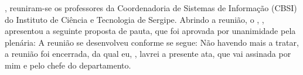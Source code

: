 \documentclass[12pt,a4paper]{ata}
\begin{document}
%
\label{Introdução da ata}
\hojeporextenso, reuniram-se \tiporeuniaoadv{} os professores da Coordenadoria de Sistemas de Informação (CBSI) do Instituto de Ciência e Tecnologia de Sergipe.
%
\presentes
%
%
\justificados
%
\ausentes
%
Abrindo a reunião, o \prof \presidiu, \cargopresidiu, apresentou a
seguinte proposta de pauta, que foi aprovada por unanimidade pela
plenária:
%
\pauta
%
A reunião se desenvolveu conforme se segue:
% 
\desenvolvimento
% 
Não havendo mais a tratar, a reunião foi encerrada, da qual eu,
\secretariou, lavrei a presente ata, que vai assinada por mim e pelo
chefe do departamento.
%
\end{document}
